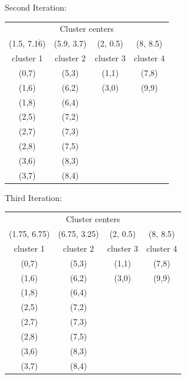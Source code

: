 \documentclass[10pt,a4paper]{article}
\begin{document}
\begin{enumerate}
			Second Iteration:
			\begin{table}[h!]
				\centering
				\begin{tabular}{cccc}
					\toprule
					\multicolumn{4}{c}{Cluster centers} \\
					(1.5, 7.1$\dot{6}$) & (5.9, 3.7) & (2, 0.5) & (8, 8.5) \\
					cluster 1 &	cluster 2 &	cluster 3 & cluster 4 \\ \midrule
					(0,7) &	(5,3) &	(1,1) & (7,8) \\
					(1,6) &	(6,2) &	(3,0) &	(9,9) \\
					(1,8) &	(6,4) & & \\		
					(2,5) &	(7,2) & & \\		
					(2,7) & (7,3) & & \\		
					(2,8) & (7,5) & & \\		
				    (3,6) & (8,3) & & \\		
					(3,7) & (8,4) & & \\	
					\bottomrule					
				\end{tabular}
			\end{table}
		
			\clearpage
			Third Iteration:
			\begin{table}[h!]
				\centering
				\begin{tabular}{cccc}
					\toprule
					\multicolumn{4}{c}{Cluster centers} \\
					(1.75, 6.75) & (6.75, 3.25) & (2, 0.5) & (8, 8.5) \\
					cluster 1 &	cluster 2 &	cluster 3 & cluster 4 \\ \midrule
					(0,7) &	(5,3) &	(1,1) & (7,8) \\
					(1,6) &	(6,2) &	(3,0) &	(9,9) \\
					(1,8) &	(6,4) & & \\		
					(2,5) &	(7,2) & & \\		
					(2,7) & (7,3) & & \\		
					(2,8) & (7,5) & & \\		
					(3,6) & (8,3) & & \\		
					(3,7) & (8,4) & & \\	
					\bottomrule					
				\end{tabular}
			\end{table}
			

\end{enumerate}
\end{document}
